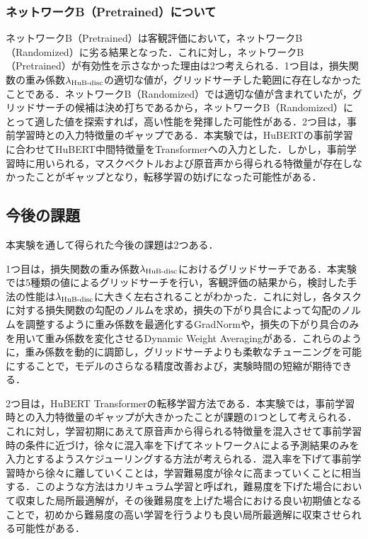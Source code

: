 \subsubsection{ネットワークB（Pretrained）について}
ネットワークB（Pretrained）は客観評価において，ネットワークB（Randomized）に劣る結果となった．これに対し，ネットワークB（Pretrained）が有効性を示さなかった理由は2つ考えられる．1つ目は，損失関数の重み係数$\lambda_{\text{HuB-disc}}$の適切な値が，グリッドサーチした範囲に存在しなかったことである．ネットワークB（Randomized）では適切な値が含まれていたが，グリッドサーチの候補は決め打ちであるから，ネットワークB（Randomized）にとって適した値を探索すれば，高い性能を発揮した可能性がある．2つ目は，事前学習時との入力特徴量のギャップである．本実験では，HuBERTの事前学習に合わせてHuBERT中間特徴量をTransformerへの入力とした．しかし，事前学習時に用いられる，マスクベクトルおよび原音声から得られる特徴量が存在しなかったことがギャップとなり，転移学習の妨げになった可能性がある．

\subsection{今後の課題}
本実験を通して得られた今後の課題は2つある．

1つ目は，損失関数の重み係数$\lambda_{\text{HuB-disc}}$におけるグリッドサーチである．本実験では5種類の値によるグリッドサーチを行い，客観評価の結果から，検討した手法の性能は$\lambda_{\text{HuB-disc}}$に大きく左右されることがわかった．これに対し，各タスクに対する損失関数の勾配のノルムを求め，損失の下がり具合によって勾配のノルムを調整するように重み係数を最適化するGradNorm\cite{chen2018gradnorm}や，損失の下がり具合のみを用いて重み係数を変化させるDynamic Weight Averaging\cite{liu2019end}がある．これらのように，重み係数を動的に調節し，グリッドサーチよりも柔軟なチューニングを可能にすることで，モデルのさらなる精度改善および，実験時間の短縮が期待できる．

2つ目は，HuBERT Transformerの転移学習方法である．本実験では，事前学習時との入力特徴量のギャップが大きかったことが課題の1つとして考えられる．これに対し，学習初期にあえて原音声から得られる特徴量を混入させて事前学習時の条件に近づけ，徐々に混入率を下げてネットワークAによる予測結果のみを入力とするようスケジューリングする方法が考えられる．混入率を下げて事前学習時から徐々に離していくことは，学習難易度が徐々に高まっていくことに相当する．このような方法はカリキュラム学習と呼ばれ，難易度を下げた場合において収束した局所最適解が，その後難易度を上げた場合における良い初期値となることで，初めから難易度の高い学習を行うよりも良い局所最適解に収束させられる可能性がある\cite{wang2021survey}．
